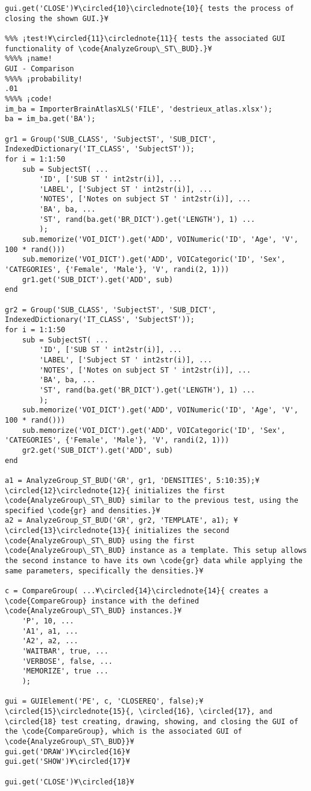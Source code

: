 \documentclass{tufte-handout}
\begin{document}
\begin{lstlisting}
gui.get('CLOSE')¥\circled{10}\circlednote{10}{ tests the process of closing the shown GUI.}¥

%%% ¡test!¥\circled{11}\circlednote{11}{ tests the associated GUI functionality of \code{AnalyzeGroup\_ST\_BUD}.}¥
%%%% ¡name!
GUI - Comparison
%%%% ¡probability!
.01
%%%% ¡code!
im_ba = ImporterBrainAtlasXLS('FILE', 'destrieux_atlas.xlsx');
ba = im_ba.get('BA');

gr1 = Group('SUB_CLASS', 'SubjectST', 'SUB_DICT', IndexedDictionary('IT_CLASS', 'SubjectST'));
for i = 1:1:50
    sub = SubjectST( ...
        'ID', ['SUB ST ' int2str(i)], ...
        'LABEL', ['Subject ST ' int2str(i)], ...
        'NOTES', ['Notes on subject ST ' int2str(i)], ...
        'BA', ba, ...
        'ST', rand(ba.get('BR_DICT').get('LENGTH'), 1) ...
        );
    sub.memorize('VOI_DICT').get('ADD', VOINumeric('ID', 'Age', 'V', 100 * rand()))
    sub.memorize('VOI_DICT').get('ADD', VOICategoric('ID', 'Sex', 'CATEGORIES', {'Female', 'Male'}, 'V', randi(2, 1)))
    gr1.get('SUB_DICT').get('ADD', sub)
end

gr2 = Group('SUB_CLASS', 'SubjectST', 'SUB_DICT', IndexedDictionary('IT_CLASS', 'SubjectST'));
for i = 1:1:50
    sub = SubjectST( ...
        'ID', ['SUB ST ' int2str(i)], ...
        'LABEL', ['Subject ST ' int2str(i)], ...
        'NOTES', ['Notes on subject ST ' int2str(i)], ...
        'BA', ba, ...
        'ST', rand(ba.get('BR_DICT').get('LENGTH'), 1) ...
        );
    sub.memorize('VOI_DICT').get('ADD', VOINumeric('ID', 'Age', 'V', 100 * rand()))
    sub.memorize('VOI_DICT').get('ADD', VOICategoric('ID', 'Sex', 'CATEGORIES', {'Female', 'Male'}, 'V', randi(2, 1)))
    gr2.get('SUB_DICT').get('ADD', sub)
end

a1 = AnalyzeGroup_ST_BUD('GR', gr1, 'DENSITIES', 5:10:35);¥\circled{12}\circlednote{12}{ initializes the first \code{AnalyzeGroup\_ST\_BUD} similar to the previous test, using the specified \code{gr} and densities.}¥
a2 = AnalyzeGroup_ST_BUD('GR', gr2, 'TEMPLATE', a1); ¥\circled{13}\circlednote{13}{ initializes the second \code{AnalyzeGroup\_ST\_BUD} using the first \code{AnalyzeGroup\_ST\_BUD} instance as a template. This setup allows the second instance to have its own \code{gr} data while applying the same parameters, specifically the densities.}¥

c = CompareGroup( ...¥\circled{14}\circlednote{14}{ creates a \code{CompareGroup} instance with the defined \code{AnalyzeGroup\_ST\_BUD} instances.}¥
    'P', 10, ...
    'A1', a1, ...
    'A2', a2, ...
    'WAITBAR', true, ...
    'VERBOSE', false, ...
    'MEMORIZE', true ...
    );

gui = GUIElement('PE', c, 'CLOSEREQ', false);¥\circled{15}\circlednote{15}{, \circled{16}, \circled{17}, and \circled{18} test creating, drawing, showing, and closing the GUI of the \code{CompareGroup}, which is the associated GUI of \code{AnalyzeGroup\_ST\_BUD}}¥
gui.get('DRAW')¥\circled{16}¥
gui.get('SHOW')¥\circled{17}¥

gui.get('CLOSE')¥\circled{18}¥

\end{lstlisting}
\end{document}
